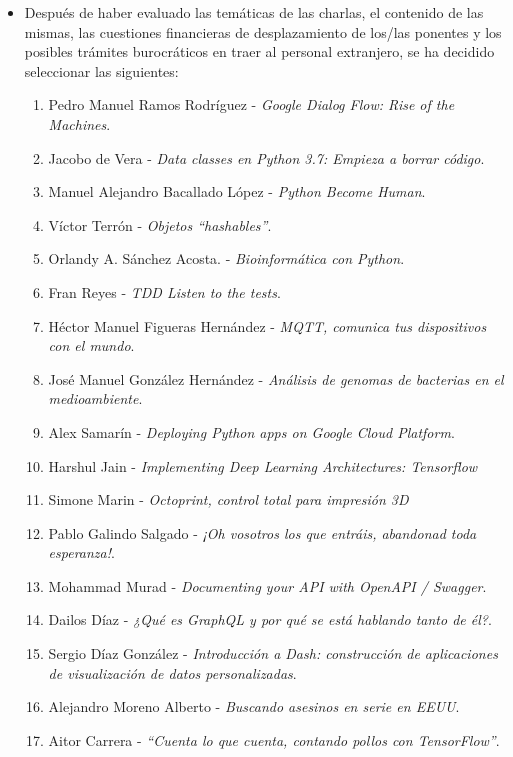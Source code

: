 \documentclass[a4paper, 12pt]{article}
\begin{document}
    \begin{itemize}
        \item Después de haber evaluado las temáticas de las charlas, el contenido de las mismas, las cuestiones financieras de desplazamiento de los/las ponentes y los posibles trámites burocráticos en traer al personal extranjero, se ha decidido seleccionar las siguientes:
        \begin{enumerate}
            \item Pedro Manuel Ramos Rodríguez - \textit{Google Dialog Flow: Rise of the Machines}.
            \item Jacobo de Vera - \textit{Data classes en Python 3.7: Empieza a borrar código}.
            \item Manuel Alejandro Bacallado López - \textit{Python Become Human}.
            \item Víctor Terrón - \textit{Objetos ``hashables''}.
            \item Orlandy A. Sánchez Acosta. - \textit{Bioinformática con Python}.
            \item Fran Reyes - \textit{TDD Listen to the tests}.
            \item Héctor Manuel Figueras Hernández - \textit{MQTT, comunica tus dispositivos con el mundo}.
            \item José Manuel González Hernández - \textit{Análisis de genomas de bacterias en el medioambiente}.
            \item Alex Samarín - \textit{Deploying Python apps on Google Cloud Platform}.
            \item Harshul Jain - \textit{Implementing Deep Learning Architectures: Tensorflow}
            \item Simone Marin - \textit{Octoprint, control total para impresión 3D}
            \item Pablo Galindo Salgado - \textit{¡Oh vosotros los que entráis, abandonad toda esperanza!}.
            \item Mohammad Murad - \textit{Documenting your API with OpenAPI / Swagger}.
            \item Dailos Díaz - \textit{¿Qué es GraphQL y por qué se está hablando tanto de él?}.
            \item Sergio Díaz González - \textit{Introducción a Dash: construcción de aplicaciones de visualización de datos personalizadas}.
            \item Alejandro Moreno Alberto - \textit{Buscando asesinos en serie en EEUU}.
            \item Aitor Carrera - \textit{``Cuenta lo que cuenta, contando pollos con TensorFlow''}.

\end{enumerate}
\end{itemize}
\end{document}
